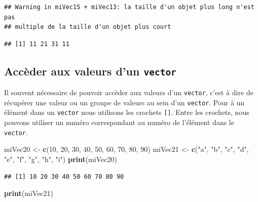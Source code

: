 \documentclass[]{book}
\newenvironment{Shaded}{\begin{snugshade}}{\end{snugshade}}
\newcommand{\KeywordTok}[1]{\textcolor[rgb]{0.13,0.29,0.53}{\textbf{#1}}}
\newcommand{\DecValTok}[1]{\textcolor[rgb]{0.00,0.00,0.81}{#1}}
\newcommand{\StringTok}[1]{\textcolor[rgb]{0.31,0.60,0.02}{#1}}
\newcommand{\NormalTok}[1]{#1}
\begin{document}
\begin{verbatim}
## Warning in miVec15 + miVec13: la taille d'un objet plus long n'est pas
## multiple de la taille d'un objet plus court
\end{verbatim}

\begin{verbatim}
## [1] 11 21 31 11
\end{verbatim}

\subsection{\texorpdfstring{Accèder aux valeurs d'un
\texttt{vector}}{Accèder aux valeurs d'un vector}}\label{acceder-aux-valeurs-dun-vector}

Il souvent nécessaire de pouvoir accèder aux valeurs d'un
\texttt{vector}, c'est à dire de récupérer une valeur ou un groupe de
valeurs au sein d'un \texttt{vector}. Pour à un élément dans un
\texttt{vector} nous utilisons les crochets \texttt{{[}{]}}. Entre les
crochets, nous pouvons utiliser un numéro correspondant au numéro de
l'élément dans le \texttt{vector}.

\begin{Shaded}
\begin{Highlighting}[]
\NormalTok{miVec20 <-}\StringTok{ }\KeywordTok{c}\NormalTok{(}\DecValTok{10}\NormalTok{, }\DecValTok{20}\NormalTok{, }\DecValTok{30}\NormalTok{, }\DecValTok{40}\NormalTok{, }\DecValTok{50}\NormalTok{, }\DecValTok{60}\NormalTok{, }\DecValTok{70}\NormalTok{, }\DecValTok{80}\NormalTok{, }\DecValTok{90}\NormalTok{)}
\NormalTok{miVec21 <-}\StringTok{ }\KeywordTok{c}\NormalTok{(}\StringTok{"a"}\NormalTok{, }\StringTok{"b"}\NormalTok{, }\StringTok{"c"}\NormalTok{, }\StringTok{"d"}\NormalTok{, }\StringTok{"e"}\NormalTok{, }\StringTok{"f"}\NormalTok{, }\StringTok{"g"}\NormalTok{, }\StringTok{"h"}\NormalTok{, }\StringTok{"i"}\NormalTok{)}
\KeywordTok{print}\NormalTok{(miVec20)}
\end{Highlighting}
\end{Shaded}

\begin{verbatim}
## [1] 10 20 30 40 50 60 70 80 90
\end{verbatim}

\begin{Shaded}
\begin{Highlighting}[]
\KeywordTok{print}\NormalTok{(miVec21)}
\end{Highlighting}
\end{Shaded}
\end{document}
